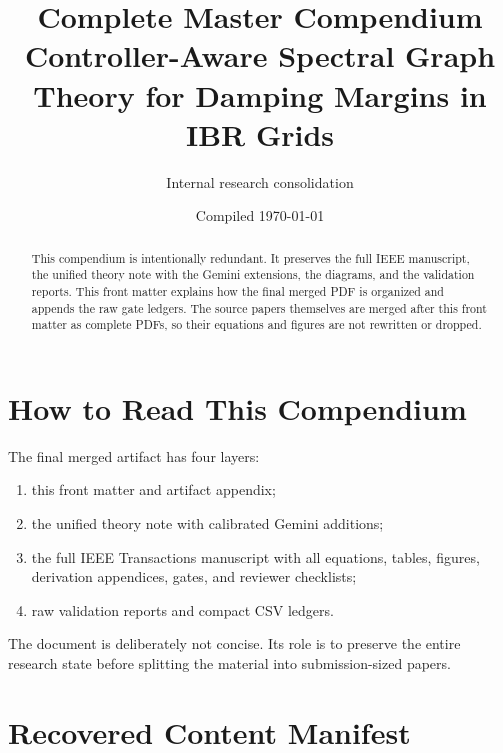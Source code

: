 \documentclass[11pt]{article}
\title{\textbf{Complete Master Compendium}\\
Controller-Aware Spectral Graph Theory for Damping Margins in IBR Grids}
\author{Internal research consolidation}
\date{Compiled \today}
\begin{document}
\maketitle

\begin{abstract}
This compendium is intentionally redundant. It preserves the full IEEE
manuscript, the unified theory note with the Gemini extensions, the diagrams,
and the validation reports. This front matter explains how the final merged PDF
is organized and appends the raw gate ledgers. The source papers themselves are
merged after this front matter as complete PDFs, so their equations and figures
are not rewritten or dropped.
\end{abstract}

\tableofcontents
\clearpage

\section*{How to Read This Compendium}

The final merged artifact has four layers:
\begin{enumerate}
\item this front matter and artifact appendix;
\item the unified theory note with calibrated Gemini additions;
\item the full IEEE Transactions manuscript with all equations, tables, figures,
derivation appendices, gates, and reviewer checklists;
\item raw validation reports and compact CSV ledgers.
\end{enumerate}

The document is deliberately not concise. Its role is to preserve the entire
research state before splitting the material into submission-sized papers.

\section*{Recovered Content Manifest}
\end{document}

